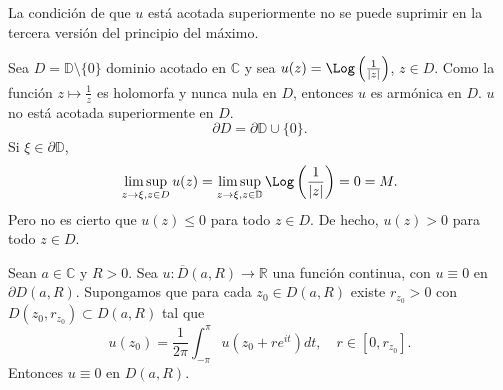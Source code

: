 \begin{remark}
    La condición de que $u$ está acotada superiormente no se puede suprimir en la tercera versión del principio del máximo.
\end{remark}

\begin{example}
    Sea $D = \mathbb{D} \setminus \{0\}$ dominio acotado en $\mathbb{C}$ y sea $u(z) = \Log\left(\frac{1}{|z|}\right)$, $z \in D$.
    Como la función $z \mapsto \frac{1}{z}$ es holomorfa y nunca nula en $D$, entonces $u$ es armónica en $D$.
    $u$ no está acotada superiormente en $D$.
    $$\partial D = \partial\mathbb{D} \cup \{0\}.$$
    Si $\xi \in \partial\mathbb{D}$,
    $$\limsup_{z \to \xi, z \in D} u(z) = \limsup_{z \to \xi, z \in \mathbb{D}} \Log\left(\frac{1}{|z|}\right) = 0 = M.$$
    Pero no es cierto que $u(z) \leq 0$ para todo $z \in D$.
    De hecho, $u(z) > 0$ para todo $z \in D$.
\end{example}

\begin{lemma}
    Sean $a \in \mathbb{C}$ y $R > 0$.
    Sea $u: \overline{D}(a, R) \to \mathbb{R}$ una función continua, con $u \equiv 0$ en $\partial D(a, R)$.
    Supongamos que para cada $z_0 \in D(a, R)$ existe $r_{z_0} > 0$ con $D(z_0, r_{z_0}) \subset D(a, R)$ tal que
    $$u(z_0) = \frac{1}{2\pi} \int_{-\pi}^\pi u(z_0 + re^{it})dt, \quad r \in [0, r_{z_0}].$$
    Entonces $u \equiv 0$ en $D(a, R)$.
\end{lemma}


